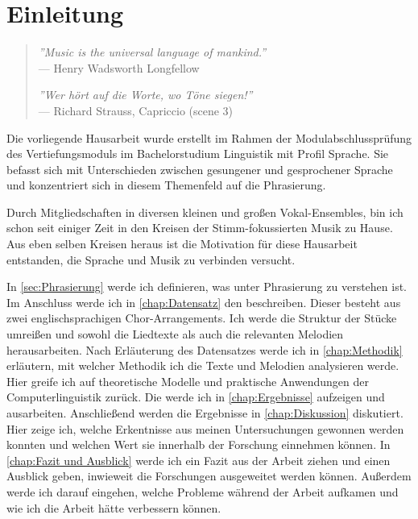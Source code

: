\chapter{Einleitung}
\label{chap:Einleitung}


\begin{quote}
\textit{''Music is the universal language of mankind.''}
\\--- Henry Wadsworth Longfellow

\textit{''Wer hört auf die Worte, wo Töne siegen!''} 
\\--- Richard Strauss, Capriccio (scene 3)
\end{quote}

\vspace{1cm}

Die vorliegende Hausarbeit wurde erstellt im Rahmen der Modulabschlussprüfung des Vertiefungsmoduls im Bachelorstudium Linguistik mit Profil Sprache. Sie befasst sich mit Unterschieden zwischen gesungener und gesprochener Sprache und konzentriert sich in diesem Themenfeld auf die Phrasierung.

Durch Mitgliedschaften in diversen kleinen und großen Vokal-Ensembles, bin ich schon seit einiger Zeit in den Kreisen der Stimm-fokussierten Musik zu Hause. Aus eben selben Kreisen heraus ist die Motivation für diese Hausarbeit entstanden, die Sprache und Musik zu verbinden versucht.

In \autoref{sec:Phrasierung} werde ich definieren, was unter Phrasierung zu verstehen ist.
Im Anschluss werde ich in \autoref{chap:Datensatz} den  beschreiben. Dieser besteht aus zwei englischsprachigen Chor-Arrangements. Ich werde die Struktur der Stücke umreißen und sowohl die Liedtexte als auch die relevanten Melodien herausarbeiten.
Nach Erläuterung des Datensatzes werde ich in \autoref{chap:Methodik} erläutern, mit welcher Methodik ich die Texte und Melodien analysieren werde. Hier greife ich auf theoretische Modelle und praktische Anwendungen der Computerlinguistik zurück.
Die  werde ich in \autoref{chap:Ergebnisse} aufzeigen und ausarbeiten.
Anschließend werden die Ergebnisse in \autoref{chap:Diskussion} diskutiert. Hier zeige ich, welche Erkentnisse aus meinen Untersuchungen gewonnen werden konnten und welchen Wert sie innerhalb der Forschung einnehmen können.
In \autoref{chap:Fazit und Ausblick} werde ich ein Fazit aus der Arbeit ziehen und einen Ausblick geben, inwieweit die Forschungen ausgeweitet werden können. Außerdem werde ich darauf eingehen, welche Probleme während der Arbeit aufkamen und wie ich die Arbeit hätte verbessern können.

